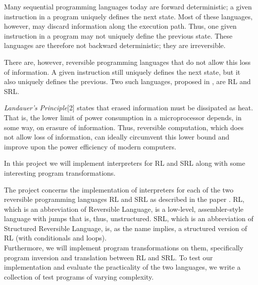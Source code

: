 %
%
Many sequential programming languages today are forward deterministic; a given instruction in a program uniquely defines the next state. Most of these languages, however, may discard information along the execution path. Thus, one given instruction in a program may not uniquely define the previous state. These languages are therefore not backward deterministic; they are irreversible.

There are, however, reversible programming languages that do not allow this loss of information. A given instruction still uniquely defines the next state, but it also uniquely defines the previous. Two such languages, proposed in \cite{REV}, are RL and SRL.

\textit{Landauer's Principle}[2] states that erased information must be dissipated as heat. That is, the lower limit of power consumption in a microprocessor depends, in some way, on erasure of information. Thus, reversible computation, which does not allow loss of information, can ideally circumvent this lower bound and improve upon the power efficiency of modern computers.

In this project we will implement interpreters for RL and SRL along with some interesting program transformations. %

The project concerns the implementation of interpreters for each of the two reversible programming languages RL and SRL as described in the paper \cite{LAN}. RL, which is an abbreviation of Reversible Language, is a low-level, assembler-style language with jumps that is, thus, unstructured. SRL, which is an abbreviation of Structured Reversible Language, is, as the name implies, a structured version of RL (with conditionals and loops). \\
\indent Furthermore, we will implement program transformations on them, specifically program inversion and translation between RL and SRL. %
To test our implementation and evaluate the practicality of the two languages, we write a collection of test programs of varying complexity.
